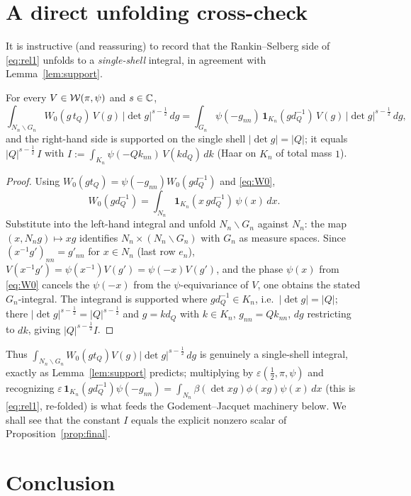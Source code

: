 \section*{A direct unfolding cross-check}

It is instructive (and reassuring) to record that the Rankin--Selberg side of
\eqref{eq:rel1} unfolds to a \emph{single-shell} integral, in agreement with
Lemma~\ref{lem:support}.

\begin{qtwolemma}\label{lem:unfold}
For every $V\in\mathcal{W}(\pi,\psi)$ and $s\in\mathbb{C}$,
\[
\int_{N_n\backslash G_n} W_0(g\,t_Q)\,V(g)\,|\det g|^{s-\frac12}\,dg
=\int_{G_n}\psi(-g_{nn})\,\mathbf 1_{K_n}(g d_Q^{-1})\,V(g)\,|\det g|^{s-\frac12}\,dg ,
\]
and the right-hand side is supported on the single shell $|\det g|=|Q|$; it equals
$|Q|^{s-\frac12}\,I$ with $I:=\int_{K_n}\psi(-Q k_{nn})\,V(k d_Q)\,dk$ (Haar on $K_n$ of total
mass $1$).
\end{qtwolemma}

\begin{proof}
Using $W_0(g t_Q)=\psi(-g_{nn})W_0(g d_Q^{-1})$ and \eqref{eq:W0},
\[
W_0(g d_Q^{-1})=\int_{N_n}\mathbf 1_{K_n}(x\,g d_Q^{-1})\,\psi(x)\,dx .
\]
Substitute into the left-hand integral and unfold $N_n\backslash G_n$ against $N_n$: the map
$(x,N_n g)\mapsto xg$ identifies $N_n\times(N_n\backslash G_n)$ with $G_n$ as measure spaces.
Since $(x^{-1}g')_{nn}=g'_{nn}$ for $x\in N_n$ (last row $e_n$), $V(x^{-1}g')=\psi(x^{-1})V(g')
=\psi(-x)V(g')$, and the phase $\psi(x)$ from \eqref{eq:W0} cancels the $\psi(-x)$ from the
$\psi$-equivariance of $V$, one obtains the stated $G_n$-integral. The integrand is supported
where $g d_Q^{-1}\in K_n$, i.e.\ $|\det g|=|Q|$; there $|\det g|^{s-\frac12}=|Q|^{s-\frac12}$ and
$g=k d_Q$ with $k\in K_n$, $g_{nn}=Q k_{nn}$, $dg$ restricting to $dk$, giving $|Q|^{s-\frac12}I$.
\end{proof}

Thus $\int_{N_n\backslash G_n}W_0(g t_Q)V(g)|\det g|^{s-\frac12}\,dg$ is genuinely a single-shell
integral, exactly as Lemma~\ref{lem:support} predicts; multiplying by $\varepsilon(\tfrac12,\pi,\psi)$
and recognizing $\varepsilon\,\mathbf 1_{K_n}(g d_Q^{-1})\psi(-g_{nn})=\int_{N_n}\beta(\det xg)\phi(xg)\psi(x)\,dx$
(this is \eqref{eq:rel1}, re-folded) is what feeds the Godement--Jacquet machinery below. We shall
see that the constant $I$ equals the explicit nonzero scalar of Proposition~\ref{prop:final}.

\section*{Conclusion}

